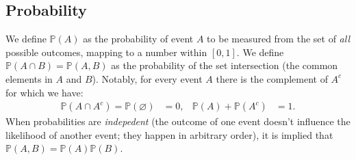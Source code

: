 \documentclass{article}
\begin{document}
\subsection{Probability}
We define $\mathbb{P}(A)$ as the probability of event $A$ to be measured from the set of \textit{all} possible outcomes, mapping to a number within $[0,1]$. We define $\mathbb{P}(A\cap B)=\mathbb{P}(A,B)$ as the probability of the set intersection (the common elements in $A$ and $B$). Notably, for every event $A$ there is the complement of $A^c$ for which we have:
\begin{align}
    \mathbb{P}(A\cap A^c)=\mathbb{P}(\varnothing)&=0,&
    \mathbb{P}(A) + \mathbb{P}(A^c)&=1.
\end{align}
When probabilities are \textit{indepedent} (the outcome of one event doesn't influence the likelihood of another event; they happen in arbitrary order), it is implied that $\mathbb{P}(A,B)=\mathbb{P}(A)\mathbb{P}(B)$.
\end{document}
